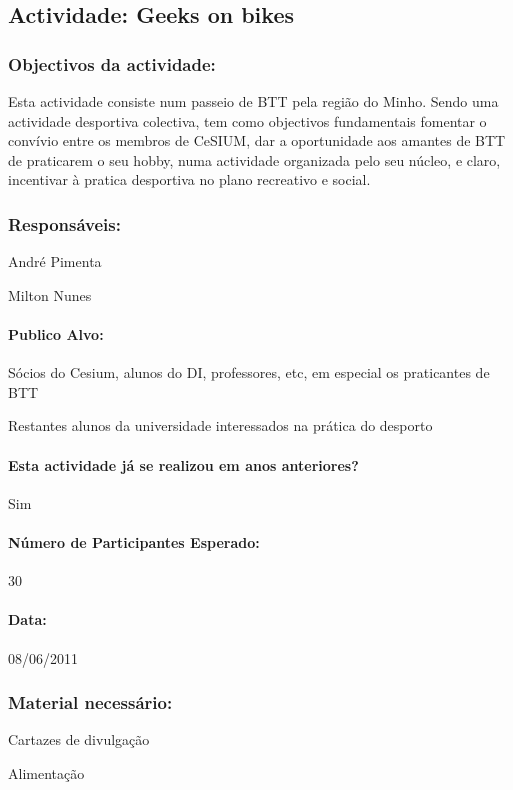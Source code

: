 \subsection{Actividade: Geeks on bikes}

\subsubsection*{Objectivos da actividade:}
Esta actividade consiste num passeio de BTT pela região do Minho. Sendo uma actividade desportiva colectiva, tem como objectivos fundamentais fomentar o convívio entre os membros de CeSIUM, dar a oportunidade aos amantes de BTT de praticarem o seu hobby, numa actividade organizada pelo seu núcleo, e claro, incentivar à pratica desportiva no plano recreativo e social. 

\subsubsection*{Responsáveis:}
\begin{itemizedash}
	\item{André Pimenta}
	\item{Milton Nunes}
\end{itemizedash}

\paragraph{Publico Alvo: }
\begin{itemizedash}
     \item{Sócios do Cesium, alunos do DI, professores, etc, em especial os praticantes de BTT}
     \item{Restantes alunos da universidade interessados na prática do desporto}
\end{itemizedash}

\paragraph{Esta actividade já se realizou em anos anteriores?}
Sim
\paragraph{Número de Participantes Esperado:}
30
\paragraph{Data:} 08/06/2011

\subsubsection*{Material necessário:}
\begin{itemizedash}
	\item{Cartazes de divulgação}
	\item{Alimentação}
\end{itemizedash}

